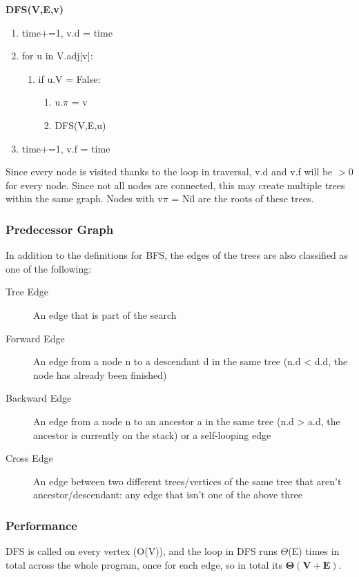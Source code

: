 \noindent \textbf{DFS(V,E,v)}
\begin{enumerate}
    \item time+=1, v.d = time
    \item for u in V.adj[v]:
    \begin{enumerate}
        \item [] if u.V = False:
        \begin{enumerate}
            \item u.$\pi$ = v
            \item DFS(V,E,u)
        \end{enumerate}
    \end{enumerate}
    \item time+=1, v.f = time
\end{enumerate}

Since every node is visited thanks to the loop in traversal, v.d and v.f will be $>0$ for every node. Since not all nodes are connected, this may create multiple trees within the same graph. Nodes with v$\pi$ = Nil are the roots of these trees.

\subsubsection{Predecessor Graph}
In addition to the definitions for BFS, the edges of the trees are also classified as one of the following:
\begin{description}
    \item [Tree Edge] An edge that is part of the search
    \item [Forward Edge] An edge from a node n to a descendant d in the same tree (n.d < d.d, the node has already been finished)
    \item [Backward Edge] An edge from a node n to an ancestor a in the same tree (n.d > a.d, the ancestor is currently on the stack) or a self-looping edge
    \item [Cross Edge] An edge between two different trees/vertices of the same tree that aren't ancestor/descendant: any edge that isn't one of the above three
\end{description}

\subsubsection{Performance}
DFS is called on every vertex (O(V)), and the loop in DFS runs $\Theta$(E) times in total across the whole program, once for each edge, so in total its $\boldsymbol{\Theta(V+E)}$.